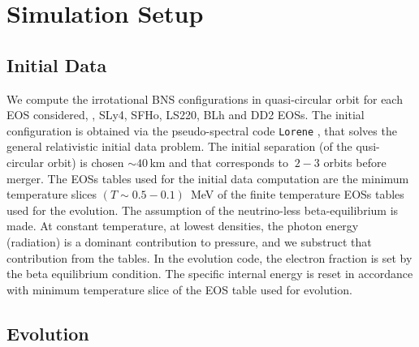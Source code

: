 \chapter{Simulation Setup} \label{app:whisky}%


\section{Initial Data}


We compute the irrotational \ac{BNS} configurations in quasi-circular orbit for 
each \ac{EOS} considered, \eg, SLy4, SFHo, LS220, BLh and DD2 \acp{EOS}.
The initial configuration is obtained via the pseudo-spectral code \texttt{Lorene} \citep{Gourgoulhon:2000nn}, 
that solves the general relativistic initial data problem. %
The initial separation (of the qusi-circular orbit) is chosen ${\sim}40\,$km and that
 corresponds to $~2-3$ orbits before merger.
%
The \acp{EOS} tables used for the initial data computation are the minimum temperature slices
$(T\sim 0.5 - 0.1)$~MeV of the finite temperature \acp{EOS} tables used for the evolution.
The assumption of the neutrino-less beta-equilibrium is made.
At constant temperature, at lowest densities, the photon energy (radiation) is a dominant 
contribution to pressure, and we substruct that contribution from the tables.
%
In the evolution code, the electron fraction is set by the beta equilibrium condition. 
The specific internal energy is reset in accordance with minimum 
temperature slice of the \ac{EOS} table used for evolution.






\section{Evolution}

